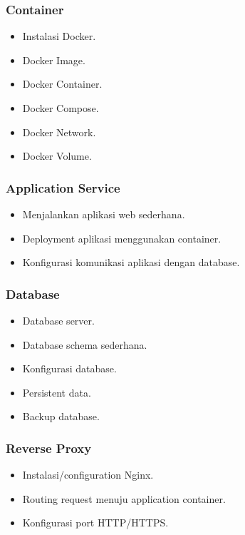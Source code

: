 \documentclass[
]{article}
\providecommand{\tightlist}{%
  \setlength{\itemsep}{0pt}\setlength{\parskip}{0pt}}
\begin{document}
\subsubsection{Container}\label{container}

\begin{itemize}
\tightlist
\item
  Instalasi Docker.
\item
  Docker Image.
\item
  Docker Container.
\item
  Docker Compose.
\item
  Docker Network.
\item
  Docker Volume.
\end{itemize}

\subsubsection{Application Service}\label{application-service}

\begin{itemize}
\tightlist
\item
  Menjalankan aplikasi web sederhana.
\item
  Deployment aplikasi menggunakan container.
\item
  Konfigurasi komunikasi aplikasi dengan database.
\end{itemize}

\subsubsection{Database}\label{database}

\begin{itemize}
\tightlist
\item
  Database server.
\item
  Database schema sederhana.
\item
  Konfigurasi database.
\item
  Persistent data.
\item
  Backup database.
\end{itemize}

\subsubsection{Reverse Proxy}\label{reverse-proxy}

\begin{itemize}
\tightlist
\item
  Instalasi/configuration Nginx.
\item
  Routing request menuju application container.
\item
  Konfigurasi port HTTP/HTTPS.
\end{itemize}
\end{document}
